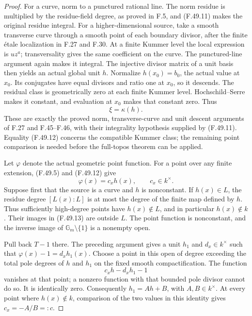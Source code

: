\begin{proof}
For a curve, norm to a punctured rational line. The norm residue
is multiplied by the residue-field degree, as proved in F.5,
and (F.49.11) makes the original residue integral.
For a higher-dimensional source, take a smooth transverse curve
through a smooth point of each boundary divisor, after the finite
étale localization in F.27 and F.30. At a finite Kummer level the
local expression is \(u z^a\); transversality gives the same
coefficient on the curve. The punctured-line argument again
makes it integral. The injective divisor matrix of a unit basis
then yields an actual global unit \(h\).
Normalize \(h(x_0)=b_0\), the actual value at \(x_0\).
Its conjugates have equal divisors and ratio one at \(x_0\),
so it descends. The residual class is geometrically zero at
each finite Kummer level. Hochschild--Serre makes it constant,
and evaluation at \(x_0\) makes that constant zero. Thus
\[
                              \xi=\kappa(h).
 \tag{F.49.12}
\]
These are exactly the proved norm, transverse-curve and unit
descent arguments of F.27 and F.45--F.46, with their integrality
hypothesis supplied by (F.49.11). Equality (F.49.12) concerns the
compatible Kummer class; the remaining point comparison is needed
before the full-topos theorem can be applied.

Let \(\varphi\) denote the actual geometric point function.
For a point over any finite extension, (F.49.5) and (F.49.12) give
\[
                         \varphi(x)=c_x h(x),\qquad c_x\in k^\times.
 \tag{F.49.13}
\]
Suppose first that the source is a curve and \(h\) is nonconstant.
If \(h(x)\in L\), the residue degree \([L(x):L]\) is at most the
degree of the finite map defined by \(h\). Thus sufficiently
high-degree points have \(h(x)\notin L\), and in particular
\(h(x)\notin k\). Their images in (F.49.13) are outside \(L\).
The point function is nonconstant, and the inverse image of
\(\mathbb G_m\setminus\{1\}\) is a nonempty open.

Pull back \(T-1\) there. The preceding argument gives a unit \(h_1\)
and \(d_x\in k^\times\) such that
\(\varphi(x)-1=d_xh_1(x)\).
Choose a point in this open of degree exceeding the total pole
degrees of \(h\) and \(h_1\) on the fixed smooth compactification.
The function
\[
                         c_xh-d_xh_1-1
\]
vanishes at that point; a nonzero function with that bounded
pole divisor cannot do so. It is identically zero.
Consequently \(h_1=Ah+B\), with \(A,B\in k^\times\).
At every point where \(h(x)\notin k\), comparison of the two
values in this identity gives \(c_x=-A/B=:c\).


\end{proof}
